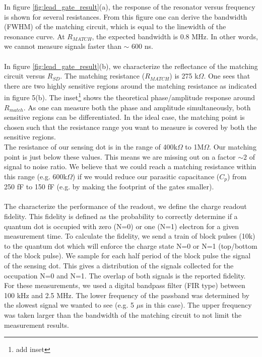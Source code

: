 \documentclass{article}
\begin{document}
	In figure \ref{fig:lead_gate_result}(a), the response of the resonator versus frequency is shown for several resistances. From this figure one can derive the bandwidth (FWHM) of the matching circuit, which is equal to the linewidth of the resonance curve. At $R_{MATCH}$, the expected bandwidth is 0.8 MHz. In other words, we cannot measure signals faster than $\sim$ 600 ns.
	\\ \\
	In figure \ref{fig:lead_gate_result}(b), we characterize the reflectance of the matching circuit versus $R_{SD}$. The matching resistance ($R_{MATCH}$) is 275 k$\Omega$. One sees that there are two highly sensitive regions around the matching resistance as indicated in figure 5(b). The inset\footnote{add inset} shows the theoretical phase/amplitude response around $R_{match}$. As one can measure both the phase and amplitude simultaneously, both sensitive regions can be differentiated. In the ideal case, the matching point is chosen such that the resistance range you want to measure is covered by both the sensitive regions. \\
	The resistance of our sensing dot is in the range of 400k$\Omega$ to 1M$\Omega$. Our matching point is just below these values. This means we are missing out on a factor $\sim2$ of signal to noise ratio. We believe that we could reach a matching resistance within this range (e.g. 600k$\Omega$) if we would reduce our parasitic capacitance ($C_p$) from 250 fF to 150 fF (e.g. by making the footprint of the gates smaller).
	\\ \\
	The characterize the performance of the readout, we define the charge readout fidelity. This fidelity is defined as the probability to correctly determine if a quantum dot is occupied with zero (N=0) or one (N=1) electron for a given measurement time. To calculate the fidelity, we send a train of block pulses (10k) to the quantum dot which will enforce the charge state N=0 or N=1 (top/bottom of the block pulse). We sample for each half period of the block pulse the signal of the sensing dot. This gives a distribution of the signals collected for the occupation N=0 and N=1. The overlap of both signals is the reported fidelity. For these measurements, we used a digital bandpass filter (FIR type) between 100 kHz and 2.5 MHz. The lower frequency of the passband was determined by the slowest signal we wanted to see (e.g. 5 $\mu$s in this case). The upper frequency was taken larger than the bandwidth of the matching circuit to not limit the measurement results.
\end{document}
